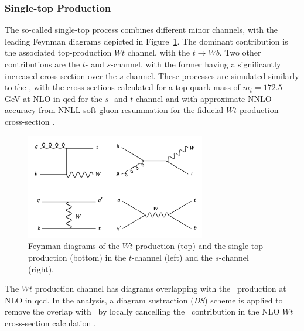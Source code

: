\subsubsection{Single-top Production}
The so-called single-top process combines different minor channels, with the leading Feynman diagrams depicted in Figure~\ref{fig:feynstop}. The dominant contribution is the associated top-production $Wt$ channel, with the $t \rightarrow Wb$. Two other contributions are the $t$- and $s$-channel, with the former having a significantly increased cross-section over the $s$-channel. These processes are simulated similarly to the \ttb, with the cross-sections calculated for a top-quark mass of $m_t = 172.5$ GeV at NLO in \gls{qcd} for the $s$- and $t$-channel \cite{ALIEV20111034, KANT201574} and with approximate NNLO accuracy from NNLL soft-gluon resummation for the fiducial $Wt$ production cross-section \cite{PhysRevD.82.054018, kidonakis2013quark}.
\begin{figure}[h!]
  \center
  \includegraphics[width=0.7\textwidth]{Images/VH/Feynman/singletop.png}
  \caption{Feynman diagrams of the $Wt$-production (top) and the single top production (bottom) in the $t$-channel (left) and the $s$-channel (right).} 
  \label{fig:feynstop}
\end{figure}

The $Wt$ production channel has diagrams overlapping with the \ttb\ production at NLO in \gls{qcd}. In the analysis, a diagram sustraction (\textit{DS}) scheme is applied to remove the overlap with \ttb\ by locally cancelling the \ttb\ contribution in the NLO $Wt$ cross-section calculation \cite{StefanoFrixione_2008}. 

